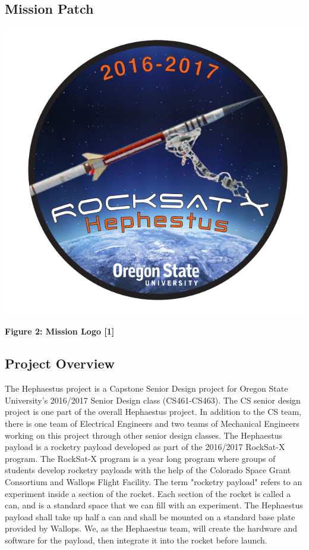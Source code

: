 \subsection{Mission Patch}
\includegraphics[width=\textwidth]{logo}
\begin{center}
\textbf{Figure 2: Mission Logo [1]}
\end{center}

\subsection{Project Overview}
The Hephaestus project is a Capstone Senior Design project for Oregon State University's 2016/2017 Senior Design class (CS461-CS463).
The CS senior design project is one part of the overall Hephaestus project.
In addition to the CS team, there is one team of Electrical Engineers and two teams of Mechanical Engineers working on this project through other senior design classes.
The Hephaestus \gls{payload} is a rocketry \gls{payload} developed as part of the 2016/2017 RockSat-X program.
The RockSat-X program is a year long program where groups of students develop rocketry payloads with the help of the Colorado Space Grant Consortium and Wallops Flight Facility.
The term "rocketry payload" refers to an experiment inside a section of the rocket.
Each section of the rocket is called a can, and is a standard space that we can fill with an experiment.
The Hephaestus payload shall take up half a can and shall be mounted on a standard base plate provided by Wallops.
We, as the Hephaestus team, will create the hardware and software for the payload, then integrate it into the rocket before launch.

